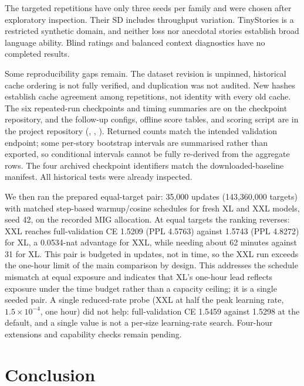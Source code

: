 \documentclass[10pt,twocolumn,letterpaper]{article}
\begin{document}
The targeted repetitions have only three seeds per family and were chosen after
exploratory inspection. Their SD includes throughput variation. TinyStories is
a restricted synthetic domain, and neither loss nor anecdotal stories establish
broad language ability. Blind ratings and balanced context diagnostics have
no completed results.

Some reproducibility gaps remain. The dataset revision is unpinned, historical
cache ordering is not fully verified, and duplication was not audited. New
hashes establish cache agreement among repetitions, not identity with every
old cache. The six repeated-run checkpoints and timing summaries are on the checkpoint repository,
and the follow-up configs, offline score tables, and scoring script are in the project
repository (, , ).
Returned counts match the intended validation endpoint; some per-story bootstrap intervals
are summarised rather than exported, so conditional intervals cannot be fully re-derived
from the aggregate rows.
The four archived checkpoint identifiers match the downloaded-baseline manifest.
All historical tests were already inspected.

We then ran the prepared equal-target pair: 35,000 updates (143,360,000 targets) with matched step-based warmup/cosine schedules for fresh XL and XXL models, seed 42, on the recorded MIG allocation. At equal targets the ranking reverses: XXL reaches full-validation CE 1.5209 (PPL 4.5763) against 1.5743 (PPL 4.8272) for XL, a 0.0534-nat advantage for XXL, while needing about 62 minutes against 31 for XL. This pair is budgeted in updates, not in time, so the XXL run exceeds the one-hour limit of the main comparison by design. This addresses the schedule mismatch at equal exposure and indicates that XL's one-hour lead reflects exposure under the time budget rather than a capacity ceiling; it is a single seeded pair. A single reduced-rate probe (XXL at half the peak learning rate, $1.5\times10^{-4}$, one hour) did not help: full-validation CE 1.5459 against 1.5298 at the default, and a single value is not a per-size learning-rate search. Four-hour extensions and capability checks remain pending.

\section{Conclusion}
\end{document}
